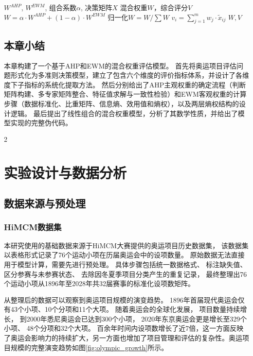 \documentclass[twoside]{CUGThesis}
\begin{document}
\begin{algorithm}[htbp]
\caption{混合权重与综合评分}
\label{alg:hybrid}
\begin{algorithmic}[1]
\REQUIRE $W^{AHP}$, $W^{EWM}$, 组合系数$\alpha$, 决策矩阵$X$
\ENSURE 混合权重$W$，综合评分$V$
\STATE $W = \alpha \cdot W^{AHP} + (1-\alpha) \cdot W^{EWM}$
\STATE 归一化$W = W / \sum W$
\STATE $v_i = \sum_{j=1}^m w_j \cdot \tilde{x}_{ij}$
\ENDFOR
\RETURN $W, V$
\end{algorithmic}
\end{algorithm}

\subsection{本章小结}

本章构建了一个基于AHP和EWM的混合权重评估模型。
首先将奥运项目评估问题形式化为多准则决策模型，建立了包含六个维度的评价指标体系，并设计了各维度下子指标的系统化提取方法。
然后分别给出了AHP主观权重的确定流程（判断矩阵构建、多专家矩阵整合、特征值求解与一致性检验）和EWM客观权重的计算步骤（数据标准化、比重矩阵、信息熵、效用值和熵权），以及两层熵权结构的设计逻辑。
最后提出了线性组合的混合权重模型，分析了其数学性质，并给出了模型实现的完整伪代码。


\begin{spacing}{2}\section{实验设计与数据分析}\end{spacing}

\subsection{数据来源与预处理}

\subsubsection{HiMCM数据集}

本研究使用的基础数据来源于HiMCM大赛提供的奥运项目历史数据集，
该数据集以表格形式记录了76个运动小项在历届奥运会中的设项数量。
原始数据无法直接用于模型计算，需要先进行预处理。
具体步骤包括统一数据格式、
标注缺失值、
区分参赛与未参赛状态、
去除因冬夏季项目分类产生的重复记录，
最终整理出76个运动小项从1896年至2028年共32届赛事的标准化设项数矩阵。

从整理后的数据可以观察到奥运项目规模的演变趋势。
1896年首届现代奥运会仅有43个小项、10个分项和11个大项。
随着奥运会的全球化发展，
项目数量持续增长，
到2000年悉尼奥运会已达到300个小项，
2020年东京奥运会更是增长至329个小项、
48个分项和32个大项。
百余年时间内设项数增长了近7倍，这一方面反映了奥运会影响力的持续扩大，另一方面也增加了项目管理和评估的复杂性。奥运项目规模的完整演变趋势如图\ref{fig:olympic_growth}所示。
\end{document}
